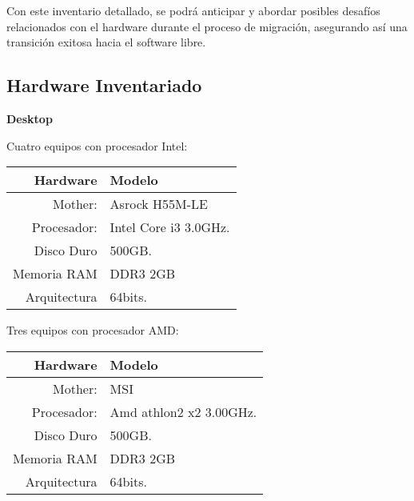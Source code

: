 Con este inventario detallado, se podrá anticipar y abordar posibles desafíos relacionados con el hardware durante el proceso de migración, asegurando así una transición exitosa hacia el software libre.\par\vspace{0.3cm}
		
		\subsection{Hardware Inventariado}
		
			\textbf{Desktop}
							
			Cuatro equipos  con procesador Intel:\par\vspace{0.2cm}
				
			\begin{center}
				\begin{tabular}{| r | l |}
					\hline
					Hardware & Modelo \\ \hline
					Mother: & Asrock H55M-LE \\ 
					Procesador: & Intel Core i3 3.0GHz. \\
					Disco Duro & 500GB. \\
					Memoria RAM & DDR3 2GB \\
					Arquitectura & 64bits.\\ \hline
				\end{tabular}
			\end{center}
		
			\vspace{0.3cm}
		
			Tres equipos con procesador AMD:\par\vspace{0.2cm}
					
			\begin{center}			
				\begin{tabular}{| r | l |}
					\hline
					Hardware & Modelo \\ \hline
					Mother: & MSI \\ 
					Procesador: & Amd athlon2 x2 3.00GHz. \\
					Disco Duro & 500GB. \\
					Memoria RAM & DDR3 2GB \\
					Arquitectura & 64bits.\\ \hline
				\end{tabular}
			\end{center}
			
